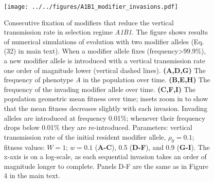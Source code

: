 \documentclass[9pt, a4paper]{extarticle}
\begin{document}
\begin{figure}
\centering
\texttt{[image: ../../figures/A1B1\_modifier\_invasions.pdf]}
\caption{Consecutive fixation of modifiers that reduce the vertical
transmission rate in selection regime \emph{A1B1}. The figure shows
results of numerical simulations of evolution with two modifier alleles
(Eq. (32) in main text).
When a modifier allele fixes (frequency\textgreater{}99.9\%), a new modifier allele is introduced with a vertical transmission rate one order of magnitude lower (vertical
dashed lines). \textbf{(A,D,G)} The frequency of phenotype \emph{A} in
the population over time. \textbf{(B,E,H)} The frequency of the invading
modifier allele over time. \textbf{(C,F,I)} The population geometric mean
fitness over time; insets zoom in to show that the mean fitness 
decreases slightly with each invasion. 
Invading alleles are introduced at frequency 0.01\%; whenever their frequency drops below 0.01\% they are re-introduced.
Parameters: vertical transmission rate of
the initial resident modifier allele, \(\rho_0 =0.1\); fitness values:
$W=1$; $w=0.1$ (\textbf{A-C}), 0.5 (\textbf{D-F}), and 0.9
(\textbf{G-I}). The x-axis is on a log-scale, as each sequential invasion
takes an order of magnitude longer to complete.
Panels D-F are the same as in Figure 4 in the main text.
}\label{fig:A1B1_modifier_invasions}
\end{figure}




\end{document}
